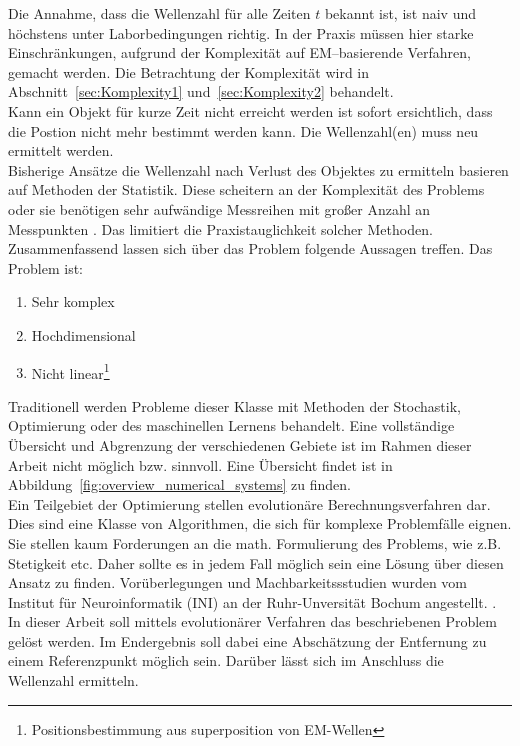 Die Annahme, dass die Wellenzahl für alle Zeiten $t$ bekannt ist, ist naiv und höchstens unter Laborbedingungen richtig. In der Praxis müssen hier starke Einschränkungen, aufgrund der Komplexität auf EM--basierende Verfahren, gemacht werden. Die Betrachtung der Komplexität wird in Abschnitt~\ref{sec:Komplexity1} und~\ref{sec:Komplexity2} behandelt.\\
Kann ein Objekt für kurze Zeit nicht erreicht werden ist sofort ersichtlich, dass die Postion nicht mehr bestimmt werden kann. Die Wellenzahl(en) muss neu ermittelt werden.\\ 
%

Bisherige Ansätze die Wellenzahl nach Verlust des Objektes zu ermitteln basieren auf Methoden der Statistik. Diese scheitern an der Komplexität des Problems oder sie benötigen sehr aufwändige Messreihen mit großer Anzahl an Messpunkten \cite{amedo1}. Das limitiert die Praxistauglichkeit solcher Methoden.\\
%

Zusammenfassend lassen sich über das Problem folgende Aussagen treffen. Das Problem ist: 
%
\begin{enumerate}
	\item Sehr komplex
	\item Hochdimensional
	\item Nicht linear\footnote{Positionsbestimmung aus superposition von EM-Wellen}
\end{enumerate}
%

Traditionell werden Probleme dieser Klasse mit Methoden der Stochastik, Optimierung oder des maschinellen Lernens behandelt. Eine vollständige Übersicht und Abgrenzung der verschiedenen Gebiete ist im Rahmen dieser Arbeit nicht möglich bzw. sinnvoll. Eine Übersicht findet ist in Abbildung~\ref{fig:overview_numerical_systems} zu finden.\\
%

Ein Teilgebiet der Optimierung stellen evolutionäre Berechnungsverfahren dar. Dies sind eine Klasse von Algorithmen, die sich für komplexe Problemfälle eignen. Sie stellen kaum Forderungen an die math. Formulierung des Problems, wie z.B. Stetigkeit etc. Daher sollte es in jedem Fall möglich sein eine Lösung über diesen Ansatz zu finden. Vorüberlegungen und Machbarkeitssstudien wurden vom Institut für Neuroinformatik (INI) an der Ruhr-Unversität Bochum angestellt. \cite{Wil1,Muz1}.\\
%

In dieser Arbeit soll mittels evolutionärer Verfahren das beschriebenen Problem gelöst werden. Im Endergebnis soll dabei eine Abschätzung der Entfernung zu einem Referenzpunkt möglich sein. Darüber lässt sich im Anschluss die Wellenzahl ermitteln.
